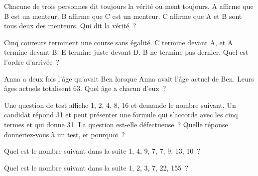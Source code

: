 \begin{question}\label{iq:iv1:sequences-patterns-and-aptitude:23}
Chacune de trois personnes dit toujours la vérité ou ment toujours. A affirme que B est un menteur. B affirme que C est un menteur. C affirme que A et B sont tous deux des menteurs. Qui dit la vérité~?
\end{question}

\begin{question}\label{iq:iv1:sequences-patterns-and-aptitude:24}
Cinq coureurs terminent une course sans égalité. C termine devant A, et A termine devant B. E termine juste devant D. B ne termine pas dernier. Quel est l'ordre d'arrivée~?
\end{question}

\begin{question}\label{iq:iv1:sequences-patterns-and-aptitude:25}
Anna a deux fois l'âge qu'avait Ben lorsque Anna avait l'âge actuel de Ben. Leurs âges actuels totalisent 63. Quel âge a chacun d'eux~?
\end{question}

\begin{question}\label{iq:iv1:sequences-patterns-and-aptitude:26}
Une question de test affiche 1, 2, 4, 8, 16 et demande le nombre suivant. Un candidat répond 31 et peut présenter une formule qui s'accorde avec les cinq termes et qui donne 31. La question est-elle défectueuse~? Quelle réponse donneriez-vous à un test, et pourquoi~?
\end{question}

\begin{question}\label{iq:iv1:sequences-patterns-and-aptitude:27}
Quel est le nombre suivant dans la suite 1, 4, 9, 7, 7, 9, 13, 10~?
\end{question}

\begin{question}\label{iq:iv1:sequences-patterns-and-aptitude:28}
Quel est le nombre suivant dans la suite 1, 2, 3, 7, 22, 155~?
\end{question}

